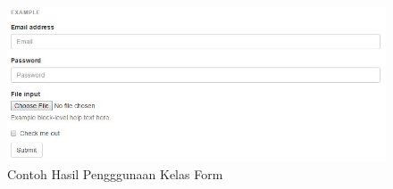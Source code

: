 \begin{figure}[H]
	\centering
	\includegraphics[scale=0.75]{Gambar/hasilForm}
	\caption{Contoh Hasil Pengggunaan Kelas Form}
	\label{fig:hasilForm}
\end{figure}